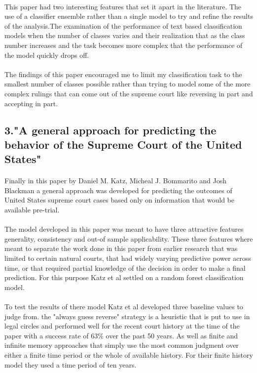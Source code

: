 \documentclass[12pt,english]{article}
\begin{document}
\paragraph{}
This paper had two interesting features that set it apart in the literature. The use of a classifier ensemble rather than a single model to try and refine the results of the analysis.The examination of the performance of text based classification models when the number of classes varies and their realization that as the class number increases and the task becomes more complex that the performance of the model quickly drops off. 
\paragraph{}
The findings of this paper encouraged me to limit my classification task to the smallest number of classes possible rather than trying to model some of the more complex rulings that can come out of the supreme court like reversing in part and accepting in part. 
\subsection{3."A general approach for predicting the behavior of the Supreme Court of the United States"}
\paragraph{}
Finally in this paper by Daniel M. Katz, Micheal J. Bommarito and Josh Blackman a general approach was developed for predicting the outcomes of United States supreme court cases based only on information that would be available pre-trial. 
\paragraph{}
The model developed in this paper was meant to have three attractive features generality, consistency and out-of sample applicability. These three features where meant to separate the work done in this paper from earlier research that was limited to certain natural courts, that had widely varying predictive power across time, or that required partial knowledge of the decision in order to make a final prediction. For this purpose Katz et al settled on a random forest classification model\citep{katz_general_2017}.
\paragraph{}
To test the results of there model Katz et al developed three baseline values to judge from. the "always guess reverse"\citep{katz_general_2017} strategy is a heuristic that is put to use in legal circles and performed well for the recent court history at the time of the paper with a success rate of 63\% over the past 50 years. As well as finite and infinite memory approaches that simply use the most common judgment over either a finite time period or the whole of available history. For their finite history model they used a time period of ten years\citep{katz_general_2017}.
\end{document}
